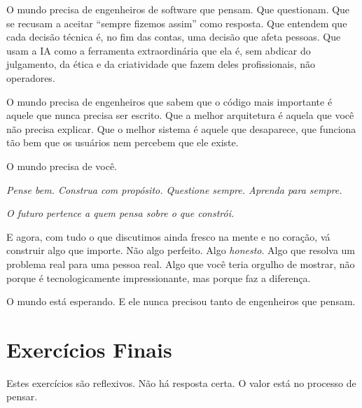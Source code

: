 O mundo precisa de engenheiros de software que pensam. Que questionam.
Que se recusam a aceitar ``sempre fizemos assim'' como resposta. Que
entendem que cada decisão técnica é, no fim das contas, uma decisão que
afeta pessoas. Que usam a IA como a ferramenta extraordinária que ela é,
sem abdicar do julgamento, da ética e da criatividade que fazem deles
profissionais, não operadores.

O mundo precisa de engenheiros que sabem que o código mais importante é
aquele que nunca precisa ser escrito. Que a melhor arquitetura é aquela
que você não precisa explicar. Que o melhor sistema é aquele que
desaparece, que funciona tão bem que os usuários nem percebem que
ele existe.

O mundo precisa de você.

\textit{Pense bem. Construa com propósito. Questione sempre. Aprenda
para sempre.}

\textit{O futuro pertence a quem pensa sobre o que constrói.}

E agora, com tudo o que discutimos ainda fresco na mente e no coração,
vá construir algo que importe. Não algo perfeito. Algo
\textit{honesto}. Algo que resolva um problema real para uma pessoa
real. Algo que você teria orgulho de mostrar, não porque é
tecnologicamente impressionante, mas porque faz a diferença.

O mundo está esperando. E ele nunca precisou tanto de engenheiros que
pensam.

\section*{Exercícios Finais}

Estes exercícios são reflexivos. Não há resposta certa. O valor está no
processo de pensar.

